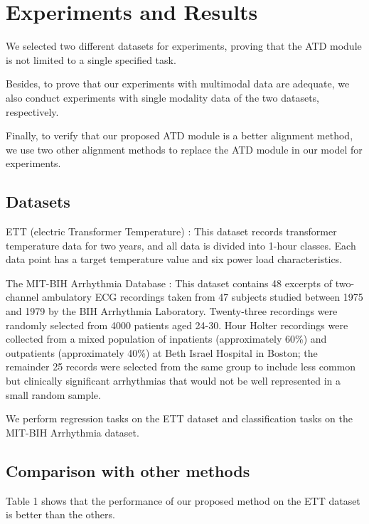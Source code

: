 \documentclass{ecai}
\begin{document}
\section{Experiments and Results}
We selected two different datasets for experiments, proving that the ATD module is not limited to a single specified task.

Besides, to prove that our experiments with multimodal data are adequate, we also conduct experiments with single modality data of the two datasets, respectively.

Finally, to verify that our proposed ATD module is a better alignment method, we use two other alignment methods to replace the ATD module in our model for experiments.

\subsection{Datasets}
 

ETT (electric Transformer Temperature) \cite{haoyietal-informer-2021}: This dataset records transformer temperature data for two years, and all data is divided into 1-hour classes. Each data point has a target temperature value and six power load characteristics.

The MIT-BIH Arrhythmia Database \cite{moody2001impact}: This dataset contains 48 excerpts of two-channel ambulatory ECG recordings taken from 47 subjects studied between 1975 and 1979 by the BIH Arrhythmia Laboratory. Twenty-three recordings were randomly selected from 4000 patients aged 24-30. Hour Holter recordings were collected from a mixed population of inpatients (approximately 60\%) and outpatients (approximately 40\%) at Beth Israel Hospital in Boston; the remainder 25 records were selected from the same group to include less common but clinically significant arrhythmias that would not be well represented in a small random sample.

We perform regression tasks on the ETT dataset and classification tasks on the MIT-BIH Arrhythmia dataset.

\subsection{Comparison with other methods}
Table 1 shows that the performance of our proposed method on the ETT dataset is better than the others.
\end{document}
